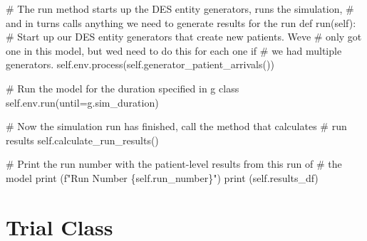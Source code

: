 \documentclass[
  letterpaper,
  DIV=11,
  numbers=noendperiod]{scrreprt}
\newenvironment{Shaded}{\begin{snugshade}}{\end{snugshade}}
\newcommand{\BuiltInTok}[1]{\textcolor[rgb]{0.00,0.23,0.31}{#1}}
\newcommand{\CommentTok}[1]{\textcolor[rgb]{0.37,0.37,0.37}{#1}}
\newcommand{\KeywordTok}[1]{\textcolor[rgb]{0.00,0.23,0.31}{#1}}
\newcommand{\NormalTok}[1]{\textcolor[rgb]{0.00,0.23,0.31}{#1}}
\newcommand{\OperatorTok}[1]{\textcolor[rgb]{0.37,0.37,0.37}{#1}}
\newcommand{\SpecialCharTok}[1]{\textcolor[rgb]{0.37,0.37,0.37}{#1}}
\newcommand{\SpecialStringTok}[1]{\textcolor[rgb]{0.13,0.47,0.30}{#1}}
\newcommand{\VariableTok}[1]{\textcolor[rgb]{0.07,0.07,0.07}{#1}}
\begin{document}
\begin{Shaded}
\begin{Highlighting}[]
    \CommentTok{\# The run method starts up the DES entity generators, runs the simulation,}
    \CommentTok{\# and in turns calls anything we need to generate results for the run}
    \KeywordTok{def}\NormalTok{ run(}\VariableTok{self}\NormalTok{):}
        \CommentTok{\# Start up our DES entity generators that create new patients.  We\textquotesingle{}ve}
        \CommentTok{\# only got one in this model, but we\textquotesingle{}d need to do this for each one if}
        \CommentTok{\# we had multiple generators.}
        \VariableTok{self}\NormalTok{.env.process(}\VariableTok{self}\NormalTok{.generator\_patient\_arrivals())}

        \CommentTok{\# Run the model for the duration specified in g class}
        \VariableTok{self}\NormalTok{.env.run(until}\OperatorTok{=}\NormalTok{g.sim\_duration)}

        \CommentTok{\# Now the simulation run has finished, call the method that calculates}
        \CommentTok{\# run results}
        \VariableTok{self}\NormalTok{.calculate\_run\_results()}

        \CommentTok{\# Print the run number with the patient{-}level results from this run of}
        \CommentTok{\# the model}
        \BuiltInTok{print}\NormalTok{ (}\SpecialStringTok{f"Run Number }\SpecialCharTok{\{}\VariableTok{self}\SpecialCharTok{.}\NormalTok{run\_number}\SpecialCharTok{\}}\SpecialStringTok{"}\NormalTok{)}
        \BuiltInTok{print}\NormalTok{ (}\VariableTok{self}\NormalTok{.results\_df)}
\end{Highlighting}
\end{Shaded}

\section{Trial Class}\label{trial-class-1}
\end{document}
